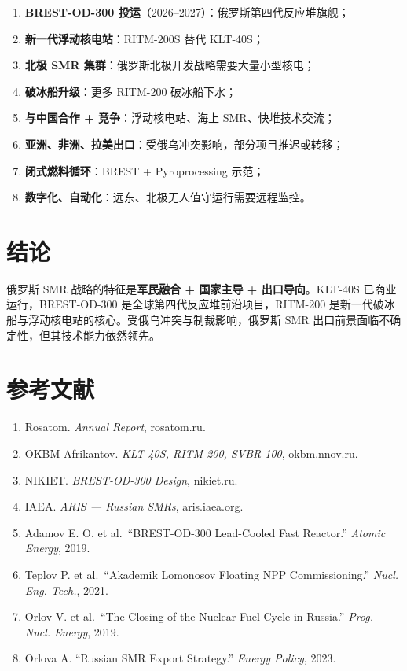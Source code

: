 \documentclass[
  UTF8,
  scheme=plain,
  fontsize=10pt,
  openany
]{ctexbook}
\begin{document}
\begin{enumerate}
\def\labelenumi{\arabic{enumi}.}
\tightlist
\item
  \textbf{BREST-OD-300 投运}（2026--2027）：俄罗斯第四代反应堆旗舰；
\item
  \textbf{新一代浮动核电站}：RITM-200S 替代 KLT-40S；
\item
  \textbf{北极 SMR 集群}：俄罗斯北极开发战略需要大量小型核电；
\item
  \textbf{破冰船升级}：更多 RITM-200 破冰船下水；
\item
  \textbf{与中国合作 + 竞争}：浮动核电站、海上 SMR、快堆技术交流；
\item
  \textbf{亚洲、非洲、拉美出口}：受俄乌冲突影响，部分项目推迟或转移；
\item
  \textbf{闭式燃料循环}：BREST + Pyroprocessing 示范；
\item
  \textbf{数字化、自动化}：远东、北极无人值守运行需要远程监控。
\end{enumerate}

\section{结论}\label{ux7ed3ux8bba-7}

俄罗斯 SMR 战略的特征是\textbf{军民融合 + 国家主导 + 出口导向}。KLT-40S
已商业运行，BREST-OD-300 是全球第四代反应堆前沿项目，RITM-200
是新一代破冰船与浮动核电站的核心。受俄乌冲突与制裁影响，俄罗斯 SMR
出口前景面临不确定性，但其技术能力依然领先。

\section{参考文献}\label{ux53c2ux8003ux6587ux732e-14}

\begin{enumerate}
\def\labelenumi{\arabic{enumi}.}
\tightlist
\item
  Rosatom. \emph{Annual Report}, rosatom.ru.
\item
  OKBM Afrikantov. \emph{KLT-40S, RITM-200, SVBR-100}, okbm.nnov.ru.
\item
  NIKIET. \emph{BREST-OD-300 Design}, nikiet.ru.
\item
  IAEA. \emph{ARIS --- Russian SMRs}, aris.iaea.org.
\item
  Adamov E. O. et al.~``BREST-OD-300 Lead-Cooled Fast Reactor.''
  \emph{Atomic Energy}, 2019.
\item
  Teplov P. et al.~``Akademik Lomonosov Floating NPP Commissioning.''
  \emph{Nucl. Eng. Tech.}, 2021.
\item
  Orlov V. et al.~``The Closing of the Nuclear Fuel Cycle in Russia.''
  \emph{Prog. Nucl. Energy}, 2019.
\item
  Orlova A. ``Russian SMR Export Strategy.'' \emph{Energy Policy}, 2023.
\end{enumerate}
\end{document}
